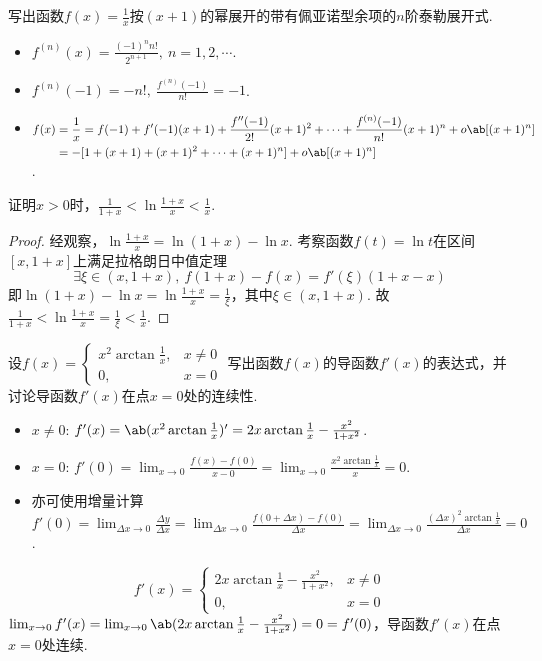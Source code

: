 \begin{problem}[泰勒展开]
    写出函数$f(x)=\frac{1}{x}$按$(x+1)$的幂展开的带有佩亚诺型余项的$n$阶泰勒展开式.
\end{problem}
\begin{solution}
\begin{itemize}
    \item $f^{(n)}(x)=\frac{(-1)^nn!}{2^{n+1}},\ n=1,2,\cdots$.
    \item $f^{(n)}(-1)=-n!,\ \frac{f^(n)(-1)}{n!}=-1$.
    \item $\begin{aligned}[t]
        f(x)&=\frac1x=f(-1)+f'(-1)(x+1)+\frac{f''(-1)}{2!}(x+1)^2+\cdots+\frac{f^{(n)}(-1)}{n!}(x+1)^n+o\ab[(x+1)^n]\\
        &=-[1+(x+1)+(x+1)^2+\cdots+(x+1)^n]+o\ab[(x+1)^n]
    \end{aligned}$.
\end{itemize}
\end{solution}

\begin{problem}[拉格朗日中值定理证明不等式]
    证明$x>0$时，$\frac{1}{1+x}<\ln\frac{1+x}{x}<\frac1x$.
\end{problem}
\begin{solution}
\begin{proof}
    经观察，$\ln\frac{1+x}{x}=\ln(1+x)-\ln x$. 考察函数$f(t)=\ln t$在区间$[x,1+x]$上满足拉格朗日中值定理
    \[\exists\xi\in(x,1+x),\ f(1+x)-f(x)=f'(\xi)(1+x-x)\]
    即$\ln(1+x)-\ln x=\ln\frac{1+x}{x}=\frac1\xi$，其中$\xi\in(x,1+x)$. 故$\frac{1}{1+x}<\ln\frac{1+x}{x}=\frac1\xi<\frac1x$.
\end{proof}
\end{solution}

\begin{problem}[函数的连续性]
    设$f(x)=\begin{cases}
        x^2\arctan\frac1x, & x\neq 0\\
        0, & x=0
    \end{cases}$
写出函数$f(x)$的导函数$f'(x)$的表达式，并讨论导函数$f'(x)$在点$x=0$处的连续性.
\end{problem}
\begin{solution}
\begin{itemize}
    \item $x\neq 0$: $f'(x)=\ab(x^2\arctan\frac1x)'=2x\arctan\frac1x-\frac{x^2}{1+x^2}$.
    \item $x=0$: $f'(0)=\lim_{x\to 0}\frac{f(x)-f(0)}{x-0}=\lim_{x\to 0}\frac{x^2\arctan\frac1x}{x}=0$.
    \item 亦可使用增量计算$f'(0)=\lim_{\Delta x\to 0}\frac{\Delta y}{\Delta x}=\lim_{\Delta x\to 0}\frac{f(0+\Delta x)-f(0)}{\Delta x}=\lim_{\Delta x\to 0}\frac{(\Delta x)^2\arctan\frac1x}{\Delta x}=0$.
\end{itemize}
\[f'(x)=\begin{cases}
    2x\arctan\frac1x-\frac{x^2}{1+x^2}, & x\neq 0\\
    0, & x=0
\end{cases}\]
$\lim_{x\to 0}f'(x)=\lim_{x\to 0}\ab(2x\arctan\frac1x-\frac{x^2}{1+x^2})=0=f'(0)$，导函数$f'(x)$在点$x=0$处连续.
\end{solution}


\vfill
{}